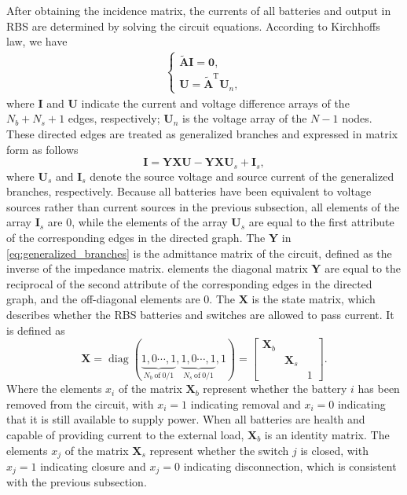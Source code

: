 \documentclass{article}
\DeclareMathOperator{\diag}{diag}
\def\T{\mathrm{T}}
\begin{document}
After obtaining the incidence matrix, the currents of all batteries and output in RBS are determined by solving the circuit equations.
According to Kirchhoffs law, we have
\begin{align}\label{eq:Kirchhoffs_law}
    \begin{cases}
        \bm{\tilde{A}} \bm{I} = \bm{0}, \\
        \bm{U}        = \bm{\tilde{A}}^\T \bm{U}_n,
    \end{cases}
\end{align}
where $\bm{I}$ and $\bm{U}$ indicate the current and voltage difference arrays of the $N_b+N_s+1$ edges, respectively;
$\bm{U}_n$ is the voltage array of the $N-1$ nodes.
These directed edges are treated as generalized branches and expressed in matrix form as follows
\begin{equation}\label{eq:generalized_branches}
    \bm{I} = \bm{Y}\bm{X} \bm{U} - \bm{Y}\bm{X} \bm{U}_s +\bm{I}_s,
\end{equation}
where $\bm{U}_s$ and $\bm{I}_s$ denote the source voltage and source current of the generalized branches, respectively.
Because all batteries have been equivalent to voltage sources rather than current sources in the previous subsection, all elements of the array $\bm{I}_s$ are 0, 
while the elements of the array $\bm{U}_s$ are equal to the first attribute of the corresponding edges in the directed graph.
The $\bm{Y}$ in  \ref{eq:generalized_branches} is the admittance matrix of the circuit, defined as the inverse of the impedance matrix.
 elements  the diagonal  matrix $\bm{Y}$ are equal to the reciprocal of  the second attribute of the corresponding edges in the directed graph, and the off-diagonal elements  are 0.
The $\bm{X}$ is the state matrix, which describes whether the RBS batteries and switches are allowed to pass current.
It is defined as
\begin{equation}\label{eq:X}
    \bm{X} = \diag(
    \underbrace{1, 0 \cdots, 1}_{N_b~\text{of}~0/1},
    \underbrace{1, 0 \cdots, 1}_{N_s~\text{of}~0/1},
    1)
    =\begin{bmatrix}
        \bm{X}_b & & \\
        & \bm{X}_s &\\
        & & 1
    \end{bmatrix}.
\end{equation}
Where the elements $x_i$ of the matrix $\bm{X}_b$ represent whether the battery $i$ has been removed from the circuit, with $x_i=1$ indicating removal and $x_i=0$ indicating that it is still available to supply power. 
When all batteries are health and capable of providing current to the external load, $\bm{X}_b$ is an identity matrix. 
The elements $x_j$ of the matrix $\bm{X}_s$ represent whether the switch $j$ is closed, with $x_j=1$ indicating closure and $x_j=0$ indicating disconnection, which is consistent with the previous subsection.
\end{document}
